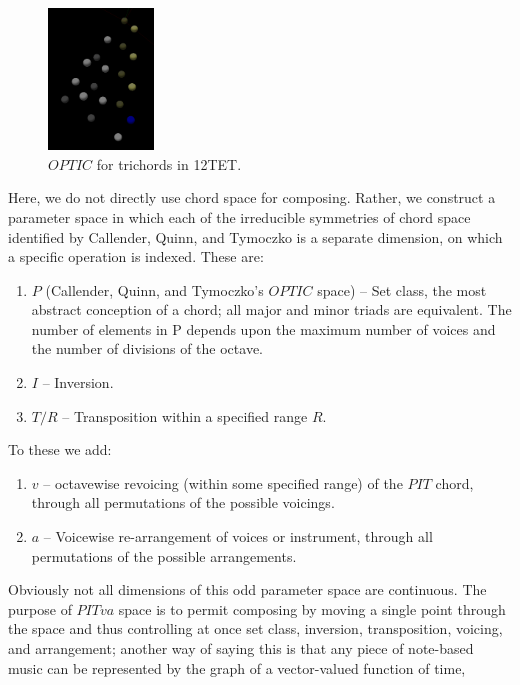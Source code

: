 \documentclass[english,11pt,letterpaper,onecolumn]{scrartcl}
\numberwithin{equation}{section}
\begin{document}
\begin{figure}
\centerline{\includegraphics[width = 0.25\textwidth]{opttic}}
\caption{\label{fig:optic}
  $OPTIC$ for trichords in 12TET.}
\end{figure}

Here, we do not directly use chord space for composing. Rather, we construct a parameter
space in which each of the irreducible symmetries of chord space identified by
Callender, Quinn, and Tymoczko is a separate dimension, on which a specific
operation is indexed. These are:

\begin{enumerate}
\item $P$ (Callender, Quinn, and Tymoczko's $OPTIC$ space) -- Set class, the
most abstract conception of a chord; all major and minor triads are equivalent.
The number of elements in P depends upon the maximum number of voices and the
number of divisions of the octave.
\item $I$ -- Inversion.
\item $T/R$ -- Transposition within a specified range $R$.
\end{enumerate}

\noindent To these we add:

\begin{enumerate}[resume]
\item $v$ -- octavewise revoicing (within some specified range) of the $PIT$
chord, through all permutations of the possible voicings.
\item $a$ -- Voicewise re-arrangement of voices or instrument, through all
permutations of the possible arrangements.
\end{enumerate}

\noindent Obviously not all dimensions of this odd parameter space are
continuous. The purpose of $PITva$ space is to permit composing by moving a
single point through the space and thus controlling at once set class,
inversion, transposition, voicing, and arrangement; another way of saying this
is that any piece of note-based music can be represented by the graph of a
vector-valued function of time,
\end{document}
